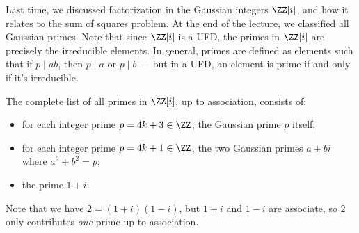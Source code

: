 Last time, we discussed factorization in the Gaussian integers $\ZZ[i]$, and how it relates to the sum of squares problem. At the end of the lecture, we classified all Gaussian primes. Note that since $\ZZ[i]$ is a UFD, the primes in $\ZZ[i]$ are precisely the irreducible elements. In general, primes are defined as elements such that if $p \mid ab$, then $p \mid a$ or $p \mid b$ --- but in a UFD, an element is prime if and only if it's irreducible.



\begin{theorem}
The complete list of all primes in $\ZZ[i]$, up to association, consists of:
\begin{itemize}
    \item for each integer prime $p = 4k + 3 \in \ZZ$, the Gaussian prime $p$ itself;
    \item for each integer prime $p = 4k + 1 \in \ZZ$, the two Gaussian primes $a \pm bi$ where $a^2 + b^2 = p$;
    \item the prime $1 + i$. 
\end{itemize}
\end{theorem}

Note that we have $2 = (1 + i)(1 - i)$, but $1 + i$ and $1 - i$ are associate, so $2$ only contributes \emph{one} prime up to association. 

